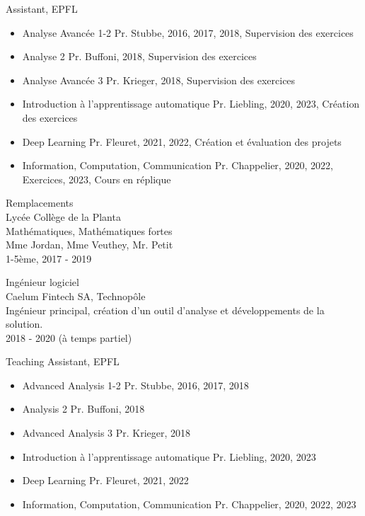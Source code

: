 \ifFrench

  \color{deepgray}
  \large Assistant, EPFL
  \color{mediumgray} \small
  \begin{itemize}
    \item \color{deepgray}Analyse Avancée 1-2 \color{mediumgray} Pr. Stubbe, 2016, 2017, 2018, Supervision des exercices
    \item \color{deepgray}Analyse 2 \color{mediumgray} Pr. Buffoni, 2018, Supervision des exercices
    \item \color{deepgray}Analyse Avancée 3 \color{mediumgray} Pr. Krieger, 2018, Supervision des exercices
    \item \color{deepgray}Introduction à l'apprentissage automatique  \color{mediumgray} Pr. Liebling, 2020, 2023, Création des exercices
    \item \color{deepgray}Deep Learning \color{mediumgray} Pr. Fleuret, 2021, 2022, Création et évaluation des projets
    \item \color{deepgray}Information, Computation, Communication  \color{mediumgray} Pr. Chappelier, 2020, 2022, Exercices, 2023, Cours en réplique
  \end{itemize}

  \commonvspace
  \color{deepgray}
  \large Remplacements \\
  \color{mediumgray} \small
  Lycée Collège de la Planta \\
  Mathématiques, Mathématiques fortes \\
  Mme Jordan, Mme Veuthey, Mr. Petit \\
  1-5ème, 2017 - 2019 \\


  \color{deepgray}
  \large Ingénieur logiciel \\
  \color{mediumgray} \small
  Caelum Fintech SA, Technopôle \\
  Ingénieur principal, création d'un outil d'analyse et développements de la solution. \\
  2018 - 2020 (à temps partiel)
  \commonvspace
\else

  \color{deepgray}
  \large Teaching Assistant, EPFL
  \color{mediumgray} \small
  \begin{itemize}
    \item \color{deepgray}Advanced Analysis 1-2  \color{mediumgray} Pr. Stubbe, 2016, 2017, 2018
    \item \color{deepgray}Analysis 2  \color{mediumgray} Pr. Buffoni, 2018
    \item \color{deepgray}Advanced Analysis 3  \color{mediumgray} Pr. Krieger, 2018
    \item \color{deepgray}Introduction à l'apprentissage automatique  \color{mediumgray} Pr. Liebling, 2020, 2023
    \item \color{deepgray}Deep Learning  \color{mediumgray} Pr. Fleuret, 2021, 2022
    \item \color{deepgray}Information, Computation, Communication  \color{mediumgray} Pr. Chappelier, 2020, 2022, 2023
  \end{itemize}

